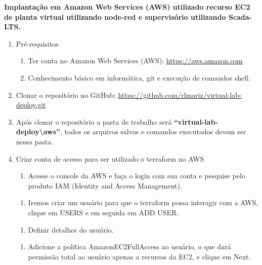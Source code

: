 \textbf{Implantação em Amazon Web Services (AWS) utilizado recurso EC2
de planta virtual utilizando node-red e supervisório utilizando
Scada-LTS.}

\begin{enumerate}
\def\labelenumi{\arabic{enumi}.}
\item
  Pré-requisitos

  \begin{enumerate}
  \def\labelenumii{\arabic{enumii}.}
  \item
    Ter conta no Amazon Web Services (AWS): \url{https://aws.amazon.com}
  \item
    Conhecimento básico em informática, git e execução de comandos
    shell.
  \end{enumerate}
\item
  Clonar o repositório no GitHub:
  \url{https://github.com/rlmariz/virtual-lab-deploy.git}
\item
  Após clonar o repositório a pasta de trabalho será
  \textbf{``virtual-lab-deploy\textbackslash aws''}, todos os arquivos
  salvos e comandos executados devem ser nessa pasta.
\item
  Criar conta de acesso para ser utilizado o terraform no AWS

  \begin{enumerate}
  \def\labelenumii{\arabic{enumii}.}
  \tightlist
  \item
    Acesse o console da AWS e faça o login com sua conta e pesquise pelo
    produto IAM (Identity and Access Management).
  \end{enumerate}

  \begin{enumerate}
  \def\labelenumii{\arabic{enumii}.}
  \setcounter{enumii}{1}
  \tightlist
  \item
    Iremos criar um usuário para que o terraform possa interagir com a
    AWS, clique em USERS e em seguida em ADD USER.
  \end{enumerate}

  \begin{enumerate}
  \def\labelenumii{\arabic{enumii}.}
  \setcounter{enumii}{2}
  \tightlist
  \item
    Definir detalhes do usuário.
  \end{enumerate}

  \begin{enumerate}
  \def\labelenumii{\arabic{enumii}.}
  \setcounter{enumii}{3}
  \tightlist
  \item
    Adicione a política AmazonEC2FullAccess ao usuário, o que dará
    permissão total ao usuário apenas a recursos da EC2, e clique em
    Next.
  \end{enumerate}


\end{enumerate}
